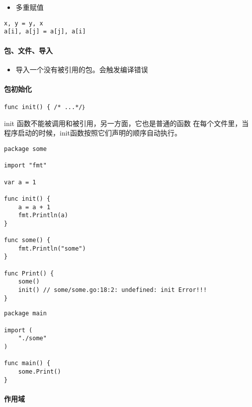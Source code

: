 \begin{itemize}
\tightlist
\item
  多重赋值
\end{itemize}

\begin{verbatim}
x, y = y, x 
a[i], a[j] = a[j], a[i]
\end{verbatim}

\hypertarget{ux5305ux6587ux4ef6ux5bfcux5165}{%
\paragraph{包、文件、导入}\label{ux5305ux6587ux4ef6ux5bfcux5165}}

\begin{itemize}
\tightlist
\item
  导入一个没有被引用的包。会触发编译错误
\end{itemize}

\hypertarget{ux5305ux521dux59cbux5316}{%
\paragraph{包初始化}\label{ux5305ux521dux59cbux5316}}

\begin{verbatim}
func init() { /* ...*/｝
\end{verbatim}

init 函数不能被调用和被引用，另一方面，它也是普通的函数
在每个文件里，当程序启动的时候，init函数按照它们声明的顺序自动执行。

\begin{verbatim}
package some

import "fmt"

var a = 1

func init() {
    a = a + 1
    fmt.Println(a)
}

func some() {
    fmt.Println("some")
}

func Print() {
    some()
    init() // some/some.go:18:2: undefined: init Error!!!
}
\end{verbatim}

\begin{verbatim}
package main

import (
    "./some"
)

func main() {
    some.Print()
}
\end{verbatim}

\hypertarget{ux4f5cux7528ux57df}{%
\paragraph{作用域}\label{ux4f5cux7528ux57df}}

